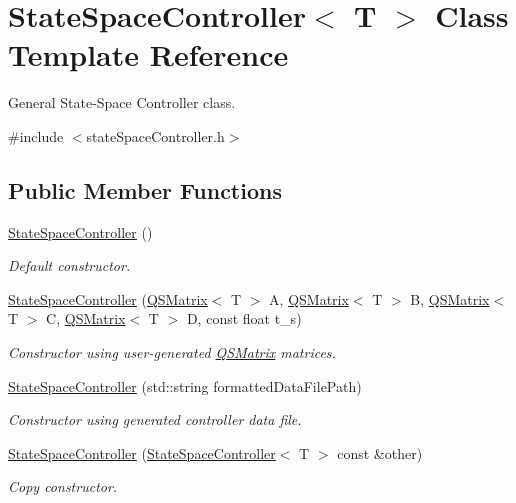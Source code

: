 \hypertarget{classStateSpaceController}{}\section{State\+Space\+Controller$<$ T $>$ Class Template Reference}
\label{classStateSpaceController}


General State-\/\+Space Controller class.  




{\ttfamily \#include $<$state\+Space\+Controller.\+h$>$}

\subsection*{Public Member Functions}
\begin{DoxyCompactItemize}
\item 
\hyperlink{classStateSpaceController_aa44a3db59ff8e25bd03d9242356a6f10}{State\+Space\+Controller} ()
\begin{DoxyCompactList}\small\item\em Default constructor. \end{DoxyCompactList}\item 
\hyperlink{classStateSpaceController_aa2541f05f5096b2793ca929b47bd4db7}{State\+Space\+Controller} (\hyperlink{classQSMatrix}{Q\+S\+Matrix}$<$ T $>$ A, \hyperlink{classQSMatrix}{Q\+S\+Matrix}$<$ T $>$ B, \hyperlink{classQSMatrix}{Q\+S\+Matrix}$<$ T $>$ C, \hyperlink{classQSMatrix}{Q\+S\+Matrix}$<$ T $>$ D, const float t\+\_\+s)
\begin{DoxyCompactList}\small\item\em Constructor using user-\/generated \hyperlink{classQSMatrix}{Q\+S\+Matrix} matrices. \end{DoxyCompactList}\item 
\hyperlink{classStateSpaceController_a95b2eaa70c08d5f5c1e54d48d0f2baed}{State\+Space\+Controller} (std\+::string formatted\+Data\+File\+Path)
\begin{DoxyCompactList}\small\item\em Constructor using generated controller data file. \end{DoxyCompactList}\item 
\hyperlink{classStateSpaceController_a7bd95b4727613f5ea3f2a3b1c0321cc3}{State\+Space\+Controller} (\hyperlink{classStateSpaceController}{State\+Space\+Controller}$<$ T $>$ const \&other)
\begin{DoxyCompactList}\small\item\em Copy constructor. \end{DoxyCompactList}\item 

\end{DoxyCompactItemize}
